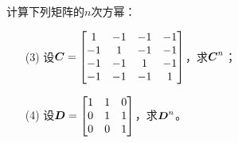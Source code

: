 \begin{problem}
计算下列矩阵的\(n\)次方幂：

\begin{enumerate}
    \item[(3)] 设\(\boldsymbol{C}=\begin{bmatrix}1&-1&-1&-1\\-1&1&-1&-1\\-1&-1&1&-1\\-1&-1&-1&1\end{bmatrix}\)，求\(\boldsymbol{C}^n\)；
    \item[(4)] 设\(\boldsymbol{D}=\begin{bmatrix}1&1&0\\0&1&1\\0&0&1\end{bmatrix}\)，求\(\boldsymbol{D}^n\)。
\end{enumerate}
\end{problem}
